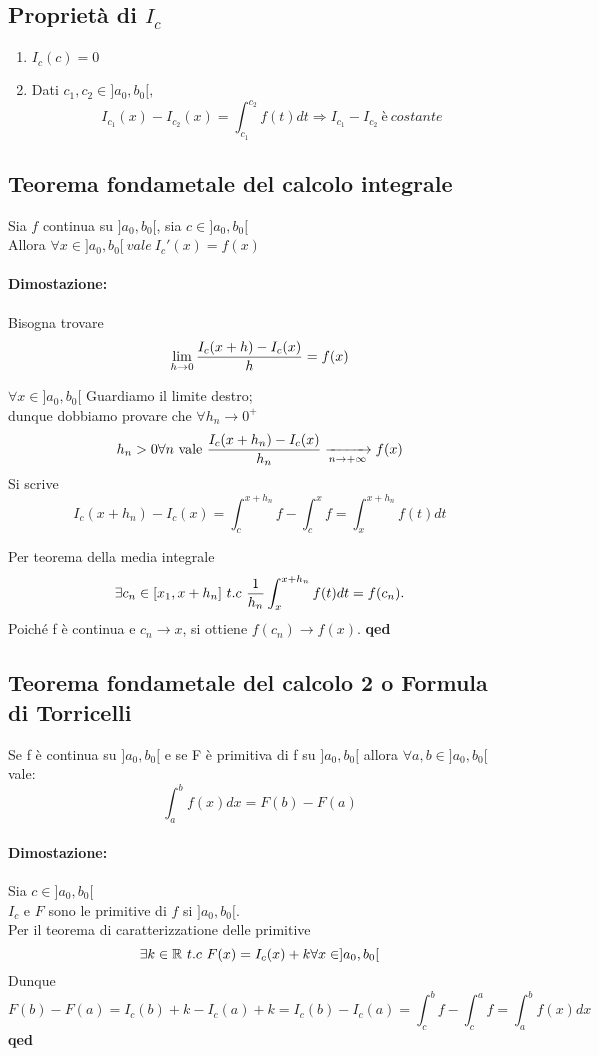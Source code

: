 \subsection{Proprietà di $I_c$}
\begin{enumerate}
		\item $ I_c(c)=0 $
		\item Dati $ c_1,c_2 \in ]a_0,b_0[,$
			$$
			I_{c_1}(x) - I_{c_2}(x) = \int_{c_1}^{c_2} f(t) dt \Rightarrow I_{c_1} - I_{c_2} \ è \ costante
			$$
\end{enumerate}

\subsection{Teorema fondametale del calcolo integrale}
Sia $f$ continua su $]a_0,b_0[$, sia $c \in ]a_0,b_0[$ \\ 
Allora $\forall x \in ]a_0,b_0[\ vale\ I_c' (x) = f(x) $

\paragraph{Dimostazione: } Bisogna trovare 
$$
\lim_{h \to 0} { I_c(x+h) - I_c(x) \over h} = f(x)
$$

$ \forall x \in ]a_0,b_0[$ Guardiamo il limite destro; \\ dunque dobbiamo provare che $ \forall h_n \to 0^+ $ \\
$$ h_n > 0 \forall n\ \text{vale}\ {I_c(x+h_n) - I_c(x) \over h_n} \xrightarrow[n \to + \infty]{} f(x) $$
Si scrive
$$
	I_c(x+h_n)-I_c(x) = \int_c^{x+h_n} f - \int_c^x f = \int_x^{x+h_n}\! f(t)dt
$$

Per teorema della media integrale $$ \exists c_n \in [x_1,x+h_n]\ t.c\ {1 \over h_n} \int_x^{x+h_n} f(t)dt = f(c_n).$$
Poiché f è continua e $ c_n \to x $, si ottiene $ f(c_n) \to f(x) $. \textbf{qed}

\subsection{Teorema fondametale del calcolo 2 o Formula di Torricelli}

Se f è continua su $]a_0,b_0[$ e se F è primitiva di f su $]a_0,b_0[$ allora $\forall a,b \in ]a_0,b_0[$ vale:
$$
\int_a^b f(x)dx = F(b)-F(a)
$$
\paragraph{Dimostazione:} Sia $c \in ]a_0,b_0[$ \\
$I_c$ e $F$ sono le primitive di $f$ si $]a_0,b_0[$. \\
Per il teorema di caratterizzatione delle primitive $$\exists k \in \mathbb{R} \ t.c\ F(x)=I_c(x)+k \forall x \in ]a_0,b_0[ $$
Dunque
$$
	F(b)-F(a)=I_c(b)+k-I_c(a)+k=I_c(b) -I_c(a) = \int_c^b f - \int_c^a f= \int_a^b f(x)dx
$$
\textbf{qed}




